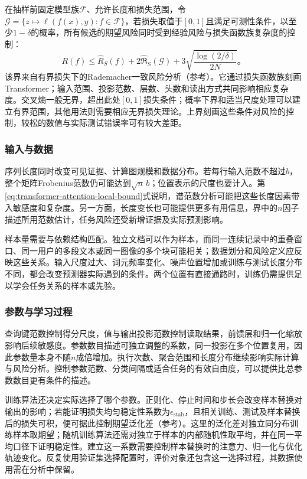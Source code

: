 在抽样前固定模型族$\mathcal F$、允许长度和损失范围，令$\mathcal G=\{z\mapsto\ell(f(x),y):f\in\mathcal F\}$，若损失取值于$[0,1]$且满足可测性条件，以至少$1-\delta$的概率，所有候选的期望风险同时受到经验风险与损失函数族复杂度的控制：
\begin{equation}
  R(f)\leq\widehat R_S(f)+2\widehat{\mathfrak R}_S(\mathcal G)
       +3\sqrt{\frac{\log(2/\delta)}{2N}}\text{。}
  \label{eq:transformer-generalization-bound}
\end{equation}
该界来自有界损失下的Rademacher一致风险分析（参考）。它通过损失函数族刻画Transformer；输入范围、投影范数、层数、头数和读出方式共同影响相应复杂度。交叉熵一般无界，超出此处$[0,1]$损失条件；概率下界和适当尺度处理可以建立有界范围，其他用法则需要相应无界损失理论。上界刻画这些条件对风险的控制，较松的数值与实际测试错误率可有较大差距。

\subsubsection{输入与数据}

序列长度同时改变可见证据、计算图规模和数据分布。若每行输入范数不超过$b$，整个矩阵Frobenius范数仍可能达到$\sqrt n\,b$；位置表示的尺度也要计入。第\ref{eq:transformer-attention-local-bound}式说明，谱范数分析可能把这些长度因素带入敏感度和复杂度。另一方面，长度变长也可能提供更多有用信息，界中的$n$因子描述所用范数估计，任务风险还受新增证据及实际预测影响。

样本量需要与依赖结构匹配。独立文档可以作为样本，而同一连续记录中的重叠窗口、同一用户的多段文本或同一图像的多个块可能相关；数据划分和风险定义应反映这些关系。输入尺度过大、词元频率变化、噪声位置增加或训练与测试长度分布不同，都会改变预测器实际遇到的条件。两个位置有直接通路时，训练仍需提供足以学会任务关系的样本或先验。

\subsubsection{参数与学习过程}

查询键范数控制得分尺度，值与输出投影范数控制读取结果，前馈层和归一化缩放影响后续敏感度。参数数目描述可独立调整的系数，同一投影在多个位置复用，因此参数量本身不随$n$成倍增加。执行次数、聚合范围和长度分布继续影响实际计算与风险分析。控制参数范数、分类间隔或适合任务的有效自由度，可以提供比总参数数目更有条件的描述。

训练算法还决定实际选择了哪个参数。正则化、停止时间和步长会改变样本替换对输出的影响；若能证明损失均匀稳定性系数为$\epsilon_{\mathrm{stab}}$，且相关训练、测试及样本替换后的损失可积，便可据此控制期望泛化差（参考）。这里的泛化差对独立同分布训练样本取期望；随机训练算法还需对独立于样本的内部随机性取平均，并在同一平均口径下证明稳定性。建立这一系数需要控制样本替换时的注意力、归一化与优化轨迹变化。反复使用验证集选择配置时，评价对象还包含这一选择过程，其数据使用需在分析中保留。

